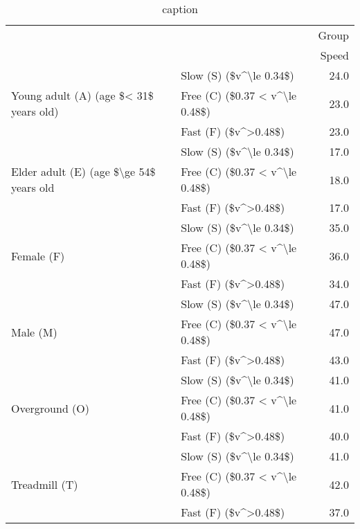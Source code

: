 \begin{table}
\centering
\caption{caption}
\label{tab:tableN}
\begin{tabular}{llr}
\toprule
              &                       &      Group \\
              &                       &      Speed \\
\midrule
\multirow{3}{*}{Young adult (A) (age \$< 31\$ years old)} & Slow (S) (\$v\textasciicircum *\textbackslash le 0.34\$) &       24.0 \\
              & Free (C) (\$0.37 < v\textasciicircum * \textbackslash le 0.48\$) &       23.0 \\
              & Fast (F) (\$v\textasciicircum *>0.48\$) &       23.0 \\
\cline{1-3}
\multirow{3}{*}{Elder adult (E) (age \$\textbackslash ge 54\$ years old} & Slow (S) (\$v\textasciicircum *\textbackslash le 0.34\$) &       17.0 \\
              & Free (C) (\$0.37 < v\textasciicircum * \textbackslash le 0.48\$) &       18.0 \\
              & Fast (F) (\$v\textasciicircum *>0.48\$) &       17.0 \\
\cline{1-3}
\multirow{3}{*}{Female (F)} & Slow (S) (\$v\textasciicircum *\textbackslash le 0.34\$) &       35.0 \\
              & Free (C) (\$0.37 < v\textasciicircum * \textbackslash le 0.48\$) &       36.0 \\
              & Fast (F) (\$v\textasciicircum *>0.48\$) &       34.0 \\
\cline{1-3}
\multirow{3}{*}{Male (M)} & Slow (S) (\$v\textasciicircum *\textbackslash le 0.34\$) &       47.0 \\
              & Free (C) (\$0.37 < v\textasciicircum * \textbackslash le 0.48\$) &       47.0 \\
              & Fast (F) (\$v\textasciicircum *>0.48\$) &       43.0 \\
\cline{1-3}
\multirow{3}{*}{Overground (O)} & Slow (S) (\$v\textasciicircum *\textbackslash le 0.34\$) &       41.0 \\
              & Free (C) (\$0.37 < v\textasciicircum * \textbackslash le 0.48\$) &       41.0 \\
              & Fast (F) (\$v\textasciicircum *>0.48\$) &       40.0 \\
\cline{1-3}
\multirow{3}{*}{Treadmill (T)} & Slow (S) (\$v\textasciicircum *\textbackslash le 0.34\$) &       41.0 \\
              & Free (C) (\$0.37 < v\textasciicircum * \textbackslash le 0.48\$) &       42.0 \\
              & Fast (F) (\$v\textasciicircum *>0.48\$) &       37.0 \\
\bottomrule
\end{tabular}
\end{table}
